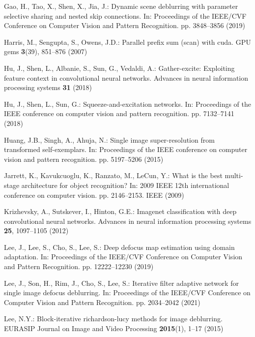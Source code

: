 \documentclass[runningheads]{llncs}
\begin{document}
\begin{thebibliography}{10}
Gao, H., Tao, X., Shen, X., Jia, J.: Dynamic scene deblurring with parameter
  selective sharing and nested skip connections. In: Proceedings of the
  IEEE/CVF Conference on Computer Vision and Pattern Recognition. pp.
  3848--3856 (2019)

Harris, M., Sengupta, S., Owens, J.D.: Parallel prefix sum (scan) with cuda.
  GPU gems  \textbf{3}(39),  851--876 (2007)

Hu, J., Shen, L., Albanie, S., Sun, G., Vedaldi, A.: Gather-excite: Exploiting
  feature context in convolutional neural networks. Advances in neural
  information processing systems  \textbf{31} (2018)

Hu, J., Shen, L., Sun, G.: Squeeze-and-excitation networks. In: Proceedings of
  the IEEE conference on computer vision and pattern recognition. pp.
  7132--7141 (2018)

Huang, J.B., Singh, A., Ahuja, N.: Single image super-resolution from
  transformed self-exemplars. In: Proceedings of the IEEE conference on
  computer vision and pattern recognition. pp. 5197--5206 (2015)

Jarrett, K., Kavukcuoglu, K., Ranzato, M., LeCun, Y.: What is the best
  multi-stage architecture for object recognition? In: 2009 IEEE 12th
  international conference on computer vision. pp. 2146--2153. IEEE (2009)

Krizhevsky, A., Sutskever, I., Hinton, G.E.: Imagenet classification with deep
  convolutional neural networks. Advances in neural information processing
  systems  \textbf{25},  1097--1105 (2012)

Lee, J., Lee, S., Cho, S., Lee, S.: Deep defocus map estimation using domain
  adaptation. In: Proceedings of the IEEE/CVF Conference on Computer Vision and
  Pattern Recognition. pp. 12222--12230 (2019)

Lee, J., Son, H., Rim, J., Cho, S., Lee, S.: Iterative filter adaptive network
  for single image defocus deblurring. In: Proceedings of the IEEE/CVF
  Conference on Computer Vision and Pattern Recognition. pp. 2034--2042 (2021)

Lee, N.Y.: Block-iterative richardson-lucy methods for image deblurring.
  EURASIP Journal on Image and Video Processing  \textbf{2015}(1),  1--17
  (2015)


\end{thebibliography}
\end{document}
